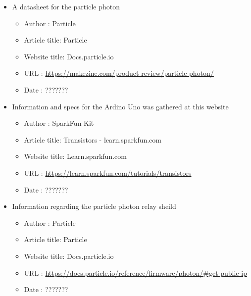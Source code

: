 \documentclass{article}
\begin{document}
\begin{thebibliography}{56}
\begin{itemize}
        \item A datasheet for the particle photon
        \begin{itemize}
            \item Author       : Particle
            \item Article title: Particle
            \item Website title: Docs.particle.io
            \item URL          : \url{https://makezine.com/product-review/particle-photon/}
            \item Date         : ???????
        \end{itemize}
    \end{itemize}

    \begin{itemize}
        \item Information and specs for the Ardino Uno was gathered at this website
        \begin{itemize}
            \item Author       : SparkFun Kit
            \item Article title: Transistors - learn.sparkfun.com
            \item Website title: Learn.sparkfun.com
            \item URL          : \url{https://learn.sparkfun.com/tutorials/transistors}
            \item Date         : ???????
        \end{itemize}
    \end{itemize}

    \begin{itemize}
        \item Information regarding the particle photon relay sheild
        \begin{itemize}
            \item Author       : Particle
            \item Article title: Particle
            \item Website title: Docs.particle.io
            \item URL          : \url{https://docs.particle.io/reference/firmware/photon/#get-public-ip}
            \item Date         : ???????
        \end{itemize}
    \end{itemize}


\end{thebibliography}
\end{document}
